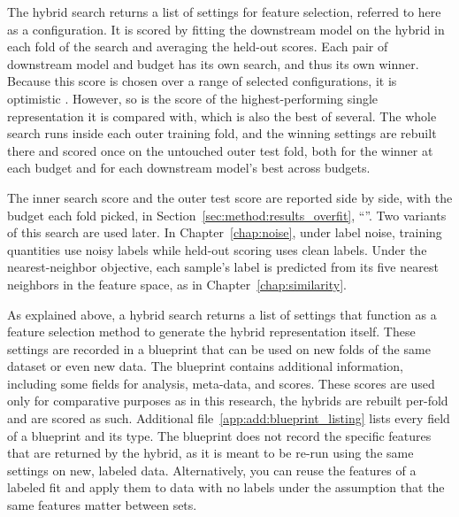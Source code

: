 The hybrid search returns a list of settings for feature selection, referred to here as a configuration. It is scored by fitting the downstream model on the hybrid in each fold of the search and averaging the held-out scores. Each pair of downstream model and budget has its own search, and thus its own winner. Because this score is chosen over a range of selected configurations, it is optimistic \citep{Varma2006, Cawley2010}. However, so is the score of the highest-performing single representation it is compared with, which is also the best of several. The whole search runs inside each outer training fold, and the winning settings are rebuilt there and scored once on the untouched outer test fold, both for the winner at each budget and for each downstream model's best across budgets.

The inner search score and the outer test score are reported side by side, with the budget each fold picked, in Section~\ref{sec:method:results_overfit}, ``''.
Two variants of this search are used later. In Chapter~\ref{chap:noise}, under label noise, training quantities use noisy labels while held-out scoring uses clean labels. Under the nearest-neighbor objective, each sample's label is predicted from its five nearest neighbors in the feature space, as in Chapter~\ref{chap:similarity}.

As explained above, a hybrid search returns a list of settings that function as a feature selection method to generate the hybrid representation itself. These settings are recorded in a blueprint that can be used on new folds of the same dataset or even new data. The blueprint contains additional information, including some fields for analysis, meta-data, and scores. These scores are used only for comparative purposes as in this research, the hybrids are rebuilt per-fold and are scored as such. Additional file~\ref{app:add:blueprint_listing} lists every field of a blueprint and its type. The blueprint does not record the specific features that are returned by the hybrid, as it is meant to be re-run using the same settings on new, labeled data. Alternatively, you can reuse the features of a labeled fit and apply them to data with no labels under the assumption that the same features matter between sets. 

